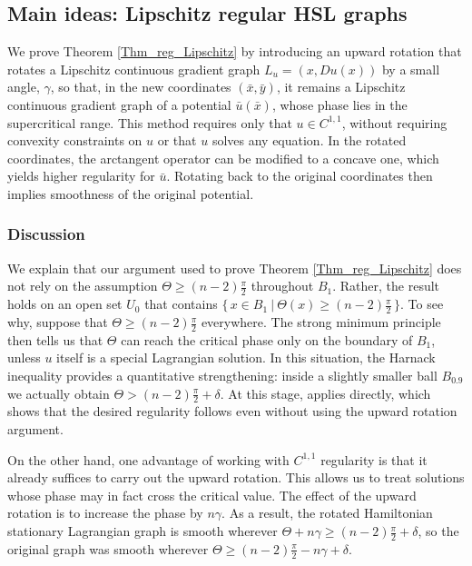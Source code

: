 \documentclass[12pt,reqno]{amsart}%
\theoremstyle{plain}
\numberwithin{equation}{section}
\theoremstyle{definition}
\theoremstyle{remark}
\begin{document}
\subsection{Main ideas: Lipschitz regular HSL graphs}  

We prove Theorem \ref{Thm_reg_Lipschitz} by introducing an upward rotation that rotates a Lipschitz continuous gradient graph $L_u = (x, Du(x))$ by a small angle, $\gamma$, so that, in the new coordinates $(\bar{x}, \bar{y})$, it remains a Lipschitz continuous gradient graph of a potential $\bar{u}(\bar{x})$, whose phase lies in the supercritical range. This method requires only that $u \in C^{1,1}$, without requiring convexity constraints on $u$ or that $u$ solves any equation. In the rotated coordinates, the arctangent operator can be modified to a concave one, which yields higher regularity for $\bar{u}$. Rotating back to the original coordinates then implies smoothness of the original potential.


\subsubsection{Discussion} \label{disc} We explain that our argument used to prove Theorem \ref{Thm_reg_Lipschitz} does not rely on the assumption $\Theta \geq (n-2)\frac{\pi}{2}$ throughout $B_1$. Rather, the result holds on an open set $U_0$ that contains
$\{\, x \in B_1 \:\vert\:  \Theta(x) \geq (n-2)\frac{\pi}{2} \,\}$. To see why, suppose that $\Theta \geq (n-2)\frac{\pi}{2}$ everywhere. The strong minimum principle then tells us that $\Theta$ can reach the critical phase only on the boundary of $B_1$, unless $u$ itself is a special Lagrangian solution. In this situation, the Harnack inequality provides a quantitative strengthening: inside a slightly smaller ball $B_{0.9}$ we actually obtain $\Theta > (n-2)\frac{\pi}{2} + \delta$. At this stage, \cite[Theorem 1.2]{ChenWarren} applies directly, which shows that the desired regularity follows even without using the upward rotation argument.

On the other hand, one advantage of working with $C^{1,1}$ regularity is that it already suffices to carry out the upward rotation. This allows us to treat solutions whose phase may in fact cross the critical value. The effect of the upward rotation is to increase the phase by $n\gamma$. As a result, the rotated Hamiltonian stationary Lagrangian graph is smooth wherever $\Theta + n\gamma \geq (n-2)\frac{\pi}{2} + \delta$, so the original graph was smooth wherever $\Theta \geq (n-2) \frac \pi 2 - n \gamma + \delta $.
\end{document}
